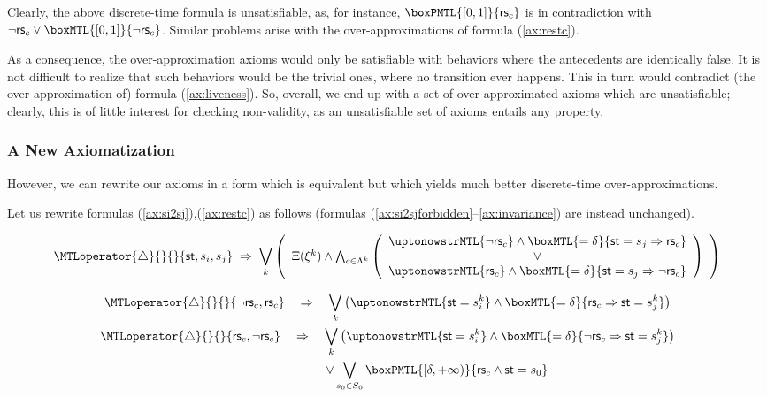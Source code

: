 \documentclass[a4paper]{article}
\newcommand{\frf}[1]{(\ref{#1})}
\newcommand{\fsrf}[2]{(\ref{#1}--\ref{#2})}
\newcommand{\st}{\mathsf{st}}
\newcommand{\rest}[1]{\mathsf{rs}_{#1}}
\newcommand{\becomesMTL}[1]{\MTLoperator{\triangle}{}{}{#1}}
\theoremstyle{plain}
\theoremstyle{definition}
\begin{document}
Clearly, the above discrete-time formula is unsatisfiable, as, for instance, $\boxPMTL{[0,1]}{\rest{c}}$ is in contradiction with $\neg \rest{c} \vee \boxMTL{[0,1]}{\neg \rest{c}}$.
Similar problems arise with the over-ap\-prox\-i\-ma\-tions of formula \frf{ax:restc}.

As a consequence, the over-ap\-prox\-i\-ma\-tion axioms would only be satisfiable with behaviors where the antecedents are identically false.
It is not difficult to realize that such behaviors would be the trivial ones, where no transition ever happens.
This in turn would contradict (the over-ap\-prox\-i\-ma\-tion of) formula \frf{ax:liveness}.
So, overall, we end up with a set of over-approximated axioms which are unsatisfiable; clearly, this is of little interest for checking non-validity, as an unsatisfiable set of axioms entails any property.



\subsubsection{A New Axiomatization}
However, we can rewrite our axioms in a form which is equivalent but which yields much better discrete-time over-ap\-prox\-i\-ma\-tions.

Let us rewrite formulas \frf{ax:si2sj},\frf{ax:restc} as follows (formulas \fsrf{ax:si2sjforbidden}{ax:invariance} are instead unchanged).

\begin{multline} \label{ax:si2sjoa}
  \becomesMTL{\st, s_i, s_j} \;\Rightarrow\;
     \bigvee_k 
     \left( \begin{array}{c}
         \Xi(\xi^k) \wedge
         \bigwedge_{c \in \Lambda^k} \left( \begin{array}{c}
             \uptonowstrMTL{\neg \rest{c}} \wedge \boxMTL{=\delta}{\st = s_j \Rightarrow \rest{c}} \\
             \vee \\ 
             \uptonowstrMTL{\rest{c}} \wedge \boxMTL{=\delta}{\st = s_j \Rightarrow \neg \rest{c}}
             \end{array} \right) 
          \end{array} \right)
\end{multline}


\begin{gather}
  \becomesMTL{\neg \rest{c}, \rest{c}} \quad \Rightarrow \quad 
    \bigvee_k \left( \uptonowstrMTL{\st = s_i^k} \wedge \boxMTL{=\delta}{\rest{c} \Rightarrow \st = s_j^k} \right)
    \nonumber \\
  \becomesMTL{\rest{c}, \neg \rest{c}} \quad \Rightarrow \quad 
       \bigvee_k \left( \uptonowstrMTL{\st = s_i^k} \wedge \boxMTL{=\delta}{\neg \rest{c} \Rightarrow \st = s_j^k} \right)
		 \nonumber \\
       \qquad \qquad \qquad \qquad \vee \bigvee_{s_0 \in S_0} \boxPMTL{[\delta, +\infty)}{\rest{c} \wedge \st = s_0}
       \label{ax:restcoa}
\end{gather}
\end{document}
